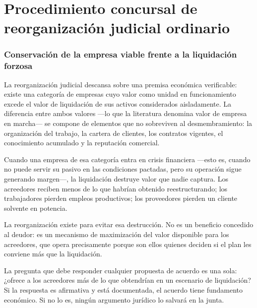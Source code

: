 \chapter{Procedimiento concursal de reorganización judicial ordinario}
\label{cap:reorganizacion-ordinaria}


\bloqueTeorico

\subsection{Conservación de la empresa viable frente a la liquidación forzosa}

La reorganización judicial descansa sobre una premisa económica verificable: existe una
categoría de empresas cuyo valor como unidad en funcionamiento excede el valor de
liquidación de sus activos considerados aisladamente. La diferencia entre ambos valores
---lo que la literatura denomina valor de empresa en marcha--- se compone de elementos que
no sobreviven al desmembramiento: la organización del trabajo, la cartera de clientes, los
contratos vigentes, el conocimiento acumulado y la reputación comercial.

Cuando una empresa de esa categoría entra en crisis financiera ---esto es, cuando no puede
servir su pasivo en las condiciones pactadas, pero su operación sigue generando margen---,
la liquidación destruye valor que nadie captura. Los acreedores reciben menos de lo que
habrían obtenido reestructurando; los trabajadores pierden empleos productivos; los
proveedores pierden un cliente solvente en potencia.

La reorganización existe para evitar esa destrucción. No es un beneficio concedido al
deudor: es un mecanismo de maximización del valor disponible para los acreedores, que
opera precisamente porque son ellos quienes deciden si el plan les conviene más que la
liquidación.

\begin{foco}
La pregunta que debe responder cualquier propuesta de acuerdo es una sola: ¿ofrece a los
acreedores más de lo que obtendrían en un escenario de liquidación? Si la respuesta es
afirmativa y está documentada, el acuerdo tiene fundamento económico. Si no lo es, ningún
argumento jurídico lo salvará en la junta.
\end{foco}

